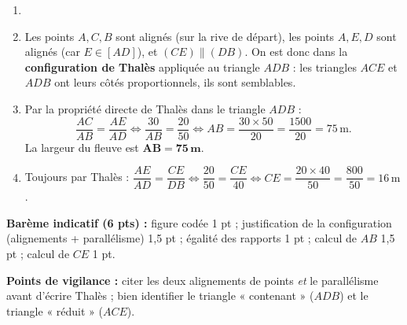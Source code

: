 \documentclass[11pt]{article}
\newcommand{\legende}[1]{\par\vspace{6pt}{\popsemi\fontsize{9}{11.5}\selectfont\color{popmuted}#1}}
\begin{document}
\begin{corrige}
\begin{enumerate}
    \item \begin{popfigure}
\legende{Dispositif de mesure de la largeur $AB$}
\end{popfigure}
    \item Les points $A, C, B$ sont alignés (sur la rive de départ), les points $A, E, D$ sont alignés (car $E \in [AD]$), et $(CE) \parallel (DB)$. On est donc dans la \textbf{configuration de Thalès} appliquée au triangle $ADB$ : les triangles $ACE$ et $ADB$ ont leurs côtés proportionnels, ils sont semblables.
    \item Par la propriété directe de Thalès dans le triangle $ADB$ :
    \[ \dfrac{AC}{AB} = \dfrac{AE}{AD} \iff \dfrac{30}{AB} = \dfrac{20}{50} \iff AB = \dfrac{30 \times 50}{20} = \dfrac{1500}{20} = 75\,\text{m}. \]
    La largeur du fleuve est $\mathbf{AB = 75\,\text{m}}$.
    \item Toujours par Thalès : $\dfrac{AE}{AD} = \dfrac{CE}{DB} \iff \dfrac{20}{50} = \dfrac{CE}{40} \iff CE = \dfrac{20 \times 40}{50} = \dfrac{800}{50} = 16\,\text{m}$.
\end{enumerate}
\textbf{Barème indicatif (6 pts) :} figure codée 1 pt ; justification de la configuration (alignements + parallélisme) 1,5 pt ; égalité des rapports 1 pt ; calcul de $AB$ 1,5 pt ; calcul de $CE$ 1 pt.

\textbf{Points de vigilance :} citer les deux alignements de points \emph{et} le parallélisme avant d'écrire Thalès ; bien identifier le triangle « contenant » ($ADB$) et le triangle « réduit » ($ACE$).
\end{corrige}
\end{document}
